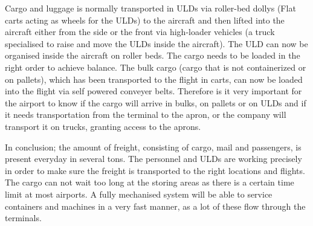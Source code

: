
Cargo and luggage is normally transported in ULDs via roller-bed dollys (Flat carts acting as wheels for the ULDs) to the aircraft and then lifted into the aircraft either from the side or the front via high-loader vehicles (a truck specialised to raise and move the ULDs inside the aircraft).
The ULD can now be organised inside the aircraft on roller beds. The cargo needs to be loaded in the right order to achieve balance. The bulk cargo (cargo that is not containerized or on pallets), which has been transported to the flight in carts, can now be loaded into the flight via self powered conveyer belts. Therefore is it very important for the airport to know if the cargo will arrive in bulks, on pallets or on ULDs and if it needs transportation from the terminal to the apron, or the company will transport it on trucks, granting access to the aprons.






In conclusion; the amount of freight, consisting of cargo, mail and passengers, is present everyday in several tons. The personnel and ULDs are working precisely  in order to make sure the freight is transported to the right locations and flights. The cargo can not wait too long at the storing areas as there is a certain time limit at  most airports. A fully mechanised system will be able to service containers and machines in a very fast manner, as a lot of these flow through the terminals.
